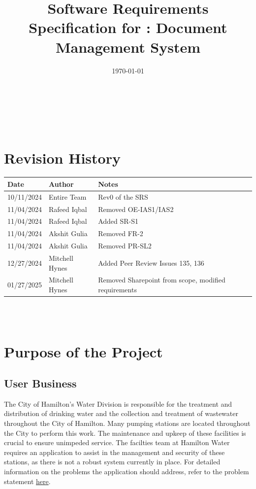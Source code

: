 \documentclass[12pt]{article}
\begin{document}
\title{Software Requirements Specification for \progname: Document
Management System}
\author{\authname}
\date{\today}

\maketitle

~\newpage


\tableofcontents

~\newpage

\section*{Revision History}

\begin{tabularx}{\textwidth}{p{3cm}p{3cm}X}
  \toprule {\textbf{Date}} & {\textbf{Author}} & {\textbf{Notes}}\\
  \midrule
  10/11/2024 & Entire Team & Rev0 of the SRS\\
  11/04/2024 & Rafeed Iqbal & Removed OE-IAS1/IAS2\\
  11/04/2024 & Rafeed Iqbal & Added SR-S1\\
  11/04/2024 & Akshit Gulia & Removed FR-2\\
  11/04/2024 & Akshit Gulia & Removed PR-SL2\\
  12/27/2024 & Mitchell Hynes & Added Peer Review Issues 135, 136\\
  01/27/2025 & Mitchell Hynes & Removed Sharepoint from scope, modified requirements\\
  \bottomrule
\end{tabularx}

~\\

~\newpage
\section{Purpose of the Project}
\subsection{User Business}
The City of Hamilton's Water Division is responsible for the
treatment and distribution of drinking water and the collection and
treatment of wastewater throughout the City of Hamilton. Many pumping
stations are located throughout the City to perform this work. The
maintenance and upkeep of these facilities is crucial to ensure
unimpeded service. The facilties team at Hamilton Water requires an
application to assist in the management and security of these
stations, as there is not a robust system currently in place. For
detailed information on the problems the application should address,
refer to the problem statement
\href{https://github.com/Spitgranger/capstone/blob/main/docs/ProblemStatementAndGoals/ProblemStatement.pdf}{here}.
\end{document}
